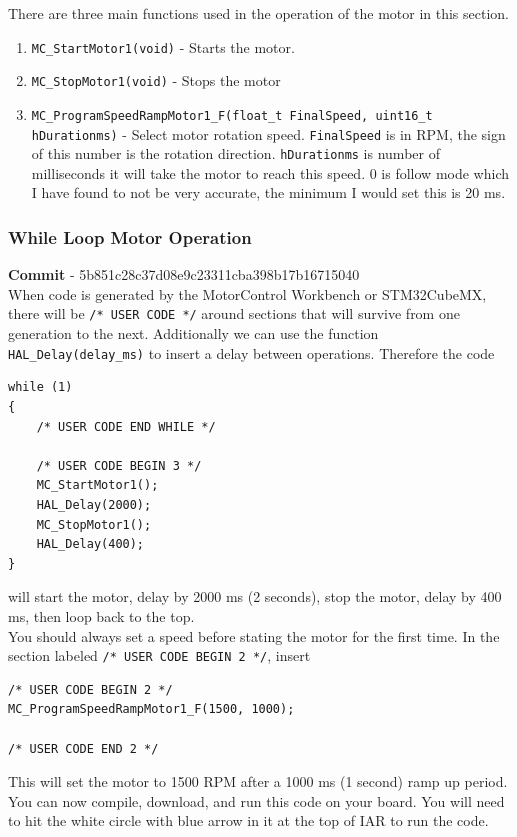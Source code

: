\documentclass[10pt]{article}
\begin{document}
                There are three main functions used in the operation of the motor in this section.
                \begin{enumerate}
                    \item \texttt{MC\_StartMotor1(void)} - Starts the motor.
                    \item \texttt{MC\_StopMotor1(void)} - Stops the motor
                    \item \texttt{MC\_ProgramSpeedRampMotor1\_F(float\_t FinalSpeed, uint16\_t hDurationms)} - Select motor rotation speed. \texttt{FinalSpeed} is in RPM, the sign of this number is the rotation direction. \texttt{hDurationms} is number of milliseconds it will take the motor to reach this speed. 0 is follow mode which I have found to not be very accurate, the minimum I would set this is 20 ms.
                \end{enumerate}
			\FloatBarrier \subsubsection{While Loop Motor Operation}
                \textbf{Commit} - 5b851c28c37d08e9c23311cba398b17b16715040 \\
                When code is generated by the MotorControl Workbench or STM32CubeMX, there will be \texttt{/* USER CODE */} around sections that will survive from one generation to the next. Additionally we can use the function \texttt{HAL\_Delay(delay\_ms)} to insert a delay between operations. Therefore the code 
                \begin{verbatim}
while (1)
{
    /* USER CODE END WHILE */

    /* USER CODE BEGIN 3 */
    MC_StartMotor1();
    HAL_Delay(2000);
    MC_StopMotor1();
    HAL_Delay(400);
}
                \end{verbatim}
                will start the motor, delay by 2000 ms (2 seconds), stop the motor, delay by 400 ms, then loop back to the top. \\ 
                You should always set a speed before stating the motor for the first time. In the section labeled \texttt{/* USER CODE BEGIN 2 */}, insert
                \begin{verbatim}
/* USER CODE BEGIN 2 */
MC_ProgramSpeedRampMotor1_F(1500, 1000);

/* USER CODE END 2 */
                \end{verbatim}
                 This will set the motor to 1500 RPM after a 1000 ms (1 second) ramp up period. You can now compile, download, and run this code on your board. You will need to hit the white circle with blue arrow in it at the top of IAR to run the code. \\
\end{document}
